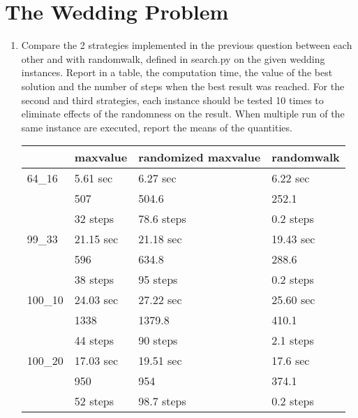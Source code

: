 \section{The Wedding Problem}
\begin{enumerate}
    \item Compare the 2 strategies implemented in the previous question between each other and with randomwalk, defined in search.py on the given wedding instances. Report in a table, the computation time, the value of the best solution and the number of steps when the best result was reached. For the second and third strategies, each instance should be tested 10 times to eliminate effects of the randomness on the result. When multiple run of the same instance are executed, report the means of the quantities.
    \begin{framed}
    	\begin{tabular}{l|l|l|l}
    					& maxvalue 		& randomized maxvalue	& randomwalk\\
            \hline
    		64\_16	 	& 5.61 sec		& 6.27 sec		& 6.22 sec\\
    					& 507			& 504.6			& 252.1\\
    					& 32 steps		& 78.6 steps	& 0.2 steps\\
    		99\_33	 	& 21.15 sec		& 21.18 sec		& 19.43 sec\\
    					& 596	 		& 634.8 		& 288.6\\
    					& 38 steps		& 95 steps		& 0.2 steps\\
    		100\_10	 	& 24.03 sec		& 27.22 sec 	& 25.60 sec\\
    					& 1338			& 1379.8		& 410.1\\
    					& 44 steps		& 90 steps		& 2.1 steps\\
    		100\_20	 	& 17.03 sec		& 19.51 sec 	& 17.6 sec\\
    					& 950 			& 954 			& 374.1\\
    					& 52 steps		& 98.7 steps 	& 0.2 steps\\
    	\end{tabular}
    \end{framed}


\end{enumerate}
